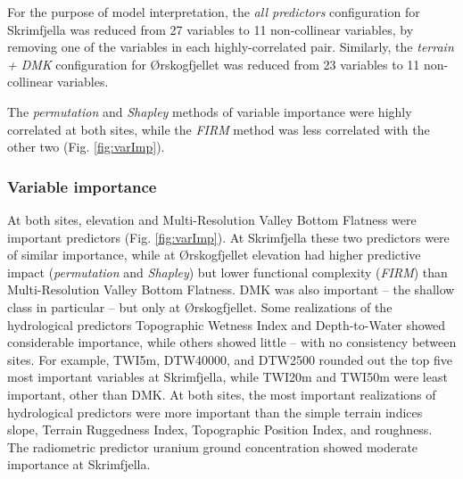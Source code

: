 \documentclass[soil, manuscript]{copernicus}
\begin{document}
For the purpose of model interpretation, the \emph{all predictors} configuration for Skrimfjella was reduced from 27 variables to 11 non-collinear variables, by removing one of the variables in each highly-correlated pair.
Similarly, the \emph{terrain + DMK} configuration for Ørskogfjellet was reduced from 23 variables to 11 non-collinear variables.

The \emph{permutation} and \emph{Shapley} methods of variable importance were highly correlated at both sites, while the \emph{FIRM} method was less correlated with the other two (Fig. \ref{fig:varImp}).

\subsubsection{Variable importance}

At both sites, elevation and Multi-Resolution Valley Bottom Flatness were important predictors (Fig. \ref{fig:varImp}).
At Skrimfjella these two predictors were of similar importance, while at Ørskogfjellet elevation had higher predictive impact (\emph{permutation} and \emph{Shapley}) but lower functional complexity (\emph{FIRM}) than Multi-Resolution Valley Bottom Flatness.
DMK was also important -- the shallow class in particular -- but only at Ørskogfjellet.
Some realizations of the hydrological predictors Topographic Wetness Index and Depth-to-Water showed considerable importance, while others showed little -- with no consistency between sites.
For example, TWI5m, DTW40000, and DTW2500 rounded out the top five most important variables at Skrimfjella, while TWI20m and TWI50m were least important, other than DMK.
At both sites, the most important realizations of hydrological predictors were more important than the simple terrain indices slope, Terrain Ruggedness Index, Topographic Position Index, and roughness.
The radiometric predictor uranium ground concentration showed moderate importance at Skrimfjella.
\end{document}
